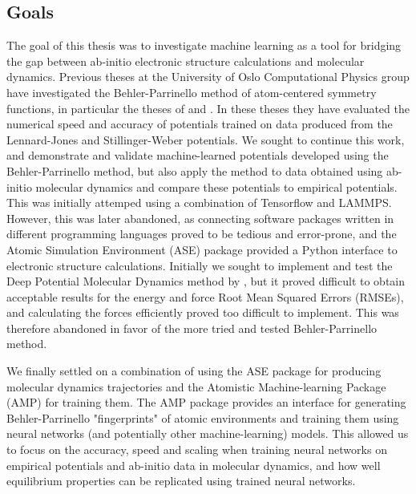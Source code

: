 \subsection{Goals}
The goal of this thesis was to investigate machine learning
as a tool for bridging the gap between ab-initio electronic structure
calculations and molecular dynamics. Previous theses at the University
of Oslo Computational Physics group have investigated the Behler-Parrinello
method of atom-centered symmetry functions, in particular the theses of
\parencite[Stende, John A,]{stende2017constructing} and
\parencite[Treider, H{\aa}kon Vik{\o}r]{treider2017speeding}.
In these theses they have evaluated the
numerical speed and accuracy of potentials trained on data
produced from the Lennard-Jones
and Stillinger-Weber potentials.
We sought to continue this work, and demonstrate and validate machine-learned
potentials developed using the Behler-Parrinello method, but also apply
the method to data obtained using ab-initio molecular dynamics
and compare these potentials to empirical potentials.
This was initially attemped using a combination of Tensorflow and LAMMPS.
However, this was later abandoned, as connecting software packages written
in different programming languages proved to be tedious and error-prone,
and the Atomic Simulation Environment (ASE) package provided a Python interface to
electronic structure calculations.
Initially we sought to implement and test the Deep Potential Molecular Dynamics
method by \parencite[Zhang et al.]{PhysRevLett.120.143001}, but
it proved difficult to obtain acceptable results for the energy
and force Root Mean Squared Errors (RMSEs), and calculating the forces
efficiently proved too difficult to implement. This was therefore abandoned
in favor of the more tried and tested Behler-Parrinello method.
\par
We finally settled on a combination of using the ASE package for producing
molecular dynamics trajectories and the Atomistic Machine-learning Package
(AMP) for training them. The AMP package provides an interface
for generating Behler-Parrinello "fingerprints" of atomic environments
and training them using neural networks (and potentially other machine-learning)
models. This allowed us to focus on the accuracy, speed and scaling
when training neural networks on empirical potentials and ab-initio
data in molecular dynamics, and how well equilibrium properties
can be replicated using trained neural networks.

